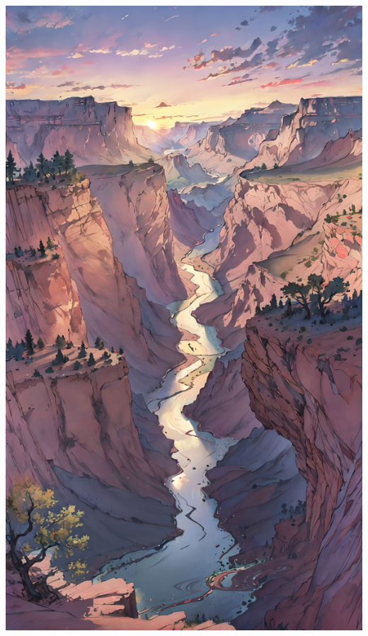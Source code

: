 \documentclass{xNoteBook}
\begin{document}

\maketitle

\frontmatter
\makesymb

\begin{center}
    \includegraphics[width=13.5cm]{image/007.jpeg}
\end{center}
\end{document}
